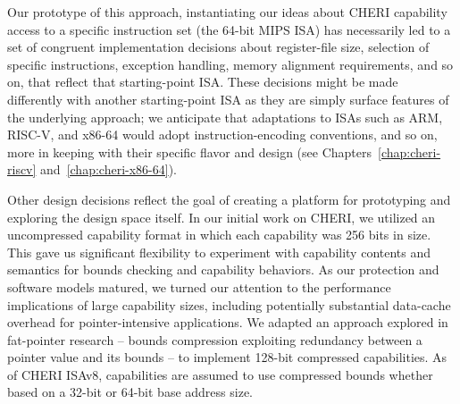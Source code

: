 Our prototype of this approach,  instantiating our ideas about CHERI
capability access to a specific instruction set (the 64-bit MIPS ISA)
has necessarily led to a set of congruent implementation decisions about
register-file size, selection of specific instructions, exception handling,
memory alignment requirements, and so on, that reflect that starting-point
ISA.
These decisions might be made differently with another starting-point ISA as
they are simply surface features of the underlying approach; we anticipate that
adaptations to ISAs such as ARM, RISC-V, and x86-64 would adopt
instruction-encoding conventions, and so on, more in keeping with their
specific flavor and design (see Chapters~\ref{chap:cheri-riscv}
and~\ref{chap:cheri-x86-64}).

Other design decisions reflect the goal of creating a platform for prototyping
and exploring the design space itself.
In our initial work on CHERI, we utilized an uncompressed capability format
in which each capability was 256 bits in size.
This gave us significant flexibility to experiment with capability contents
and semantics for bounds checking and capability behaviors.
As our protection and software models matured, we turned our attention to the
performance implications of large capability sizes, including potentially
substantial data-cache overhead for pointer-intensive applications.
We adapted an approach explored in fat-pointer research -- bounds compression
exploiting redundancy between a pointer value and its bounds -- to implement
128-bit compressed capabilities.
As of CHERI ISAv8, capabilities are assumed to use compressed bounds whether
based on a 32-bit or 64-bit base address size.

